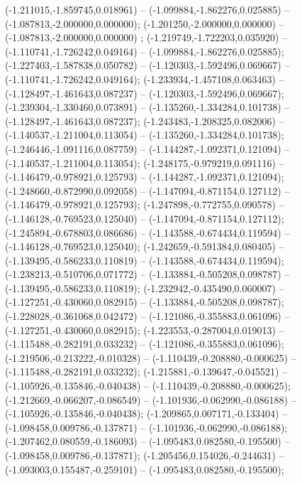  (-1.211015,-1.859745,0.018961) -- (-1.099884,-1.862276,0.025885) -- (-1.087813,-2.000000,0.000000);
 (-1.201250,-2.000000,0.000000) -- (-1.087813,-2.000000,0.000000) ;
 (-1.219749,-1.722203,0.035920) -- (-1.110741,-1.726242,0.049164) -- (-1.099884,-1.862276,0.025885);
 (-1.227403,-1.587838,0.050782) -- (-1.120303,-1.592496,0.069667) -- (-1.110741,-1.726242,0.049164);
 (-1.233934,-1.457108,0.063463) -- (-1.128497,-1.461643,0.087237) -- (-1.120303,-1.592496,0.069667);
 (-1.239304,-1.330460,0.073891) -- (-1.135260,-1.334284,0.101738) -- (-1.128497,-1.461643,0.087237);
 (-1.243483,-1.208325,0.082006) -- (-1.140537,-1.211004,0.113054) -- (-1.135260,-1.334284,0.101738);
 (-1.246446,-1.091116,0.087759) -- (-1.144287,-1.092371,0.121094) -- (-1.140537,-1.211004,0.113054);
 (-1.248175,-0.979219,0.091116) -- (-1.146479,-0.978921,0.125793) -- (-1.144287,-1.092371,0.121094);
 (-1.248660,-0.872990,0.092058) -- (-1.147094,-0.871154,0.127112) -- (-1.146479,-0.978921,0.125793);
 (-1.247898,-0.772755,0.090578) -- (-1.146128,-0.769523,0.125040) -- (-1.147094,-0.871154,0.127112);
 (-1.245894,-0.678803,0.086686) -- (-1.143588,-0.674434,0.119594) -- (-1.146128,-0.769523,0.125040);
 (-1.242659,-0.591384,0.080405) -- (-1.139495,-0.586233,0.110819) -- (-1.143588,-0.674434,0.119594);
 (-1.238213,-0.510706,0.071772) -- (-1.133884,-0.505208,0.098787) -- (-1.139495,-0.586233,0.110819);
 (-1.232942,-0.435490,0.060007) -- (-1.127251,-0.430060,0.082915) -- (-1.133884,-0.505208,0.098787);
 (-1.228028,-0.361068,0.042472) -- (-1.121086,-0.355883,0.061096) -- (-1.127251,-0.430060,0.082915);
 (-1.223553,-0.287004,0.019013) -- (-1.115488,-0.282191,0.033232) -- (-1.121086,-0.355883,0.061096);
 (-1.219506,-0.213222,-0.010328) -- (-1.110439,-0.208880,-0.000625) -- (-1.115488,-0.282191,0.033232);
 (-1.215881,-0.139647,-0.045521) -- (-1.105926,-0.135846,-0.040438) -- (-1.110439,-0.208880,-0.000625);
 (-1.212669,-0.066207,-0.086549) -- (-1.101936,-0.062990,-0.086188) -- (-1.105926,-0.135846,-0.040438);
 (-1.209865,0.007171,-0.133404) -- (-1.098458,0.009786,-0.137871) -- (-1.101936,-0.062990,-0.086188);
 (-1.207462,0.080559,-0.186093) -- (-1.095483,0.082580,-0.195500) -- (-1.098458,0.009786,-0.137871);
 (-1.205456,0.154026,-0.244631) -- (-1.093003,0.155487,-0.259101) -- (-1.095483,0.082580,-0.195500);
